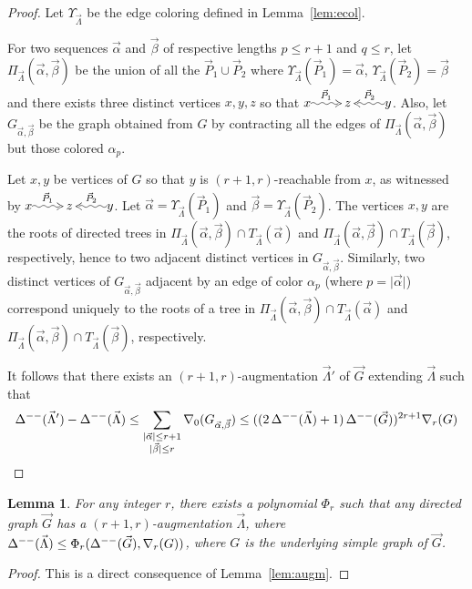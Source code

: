 \documentclass[a4paper]{amsart}
\makeatletter
\newtheorem{lemma}[theorem]{Lemma}
\theoremstyle{definition}
\theoremstyle{remark}
\newcommand\ecol[1]{\Upsilon_{#1}}
\newcommand{\rdens}[1]{\nabla_{#1}}
\newcommand{\card}[1]{\lvert{#1}\rvert}
\DeclareMathOperator\md{\Delta^{\rm --}}
\def\vG{\vec{G}}
\def\vP{\vec{P}}
\def\vL{\vec{\Lambda}}
\newcommand{\rdpath}[1]{\xy\xymatrix{*!{}\ar@{~2>}[r]^{#1}&*!{}}\endxy}
\newcommand{\ldpath}[1]{\xy\xymatrix{*!{}&*!{}\ar@{~2>}[l]_{#1}}\endxy}
\newcommand{\lambd}[5]{{#1}\rdpath{#2}{#3}\ldpath{#4}{#5}}
\makeatother
\begin{document}
\begin{proof}
Let $\ecol{\vL}$ be the edge coloring defined in
  Lemma~\ref{lem:ecol}. 

  For two sequences $\vec{\alpha}$ and $\vec{\beta}$
  of respective lengths $p\leq r+1$ and $q\leq r$,
  let $\Pi_{\vL}(\vec{\alpha},\vec{\beta})$ be the union of all the
  $\vP_1\cup\vP_2$ where $\ecol{\vL}(\vP_1)=\vec{\alpha}$,
  $\ecol{\vL}(\vP_2)=\vec{\beta}$ and there exists three distinct
  vertices $x,y,z$ so that $\lambd{x}{\vP_1}{z}{\vP_2}{y}$. Also,
  let $G_{\vec{\alpha},\vec{\beta}}$ be the graph obtained from $G$ by
  contracting all the edges of $\Pi_{\vL}(\vec{\alpha},\vec{\beta})$
  but those colored $\alpha_p$.

  Let $x,y$ be vertices of $G$ so that $y$ is
  $(r+1,r)$-reachable from $x$, as witnessed by
  $\lambd{x}{\vP_1}{z}{\vP_2}{y}$. Let 
  $\vec{\alpha}=\ecol{\vL}(\vP_1)$ and
  $\vec{\beta}=\ecol{\vL}(\vP_2)$.
  The vertices $x,y$ are the roots of directed trees in 
  $\Pi_{\vL}(\vec{\alpha},\vec{\beta})\cap T_{\vL}(\vec{\alpha})$ and
  $\Pi_{\vL}(\vec{\alpha},\vec{\beta})\cap T_{\vL}(\vec{\beta})$,
  respectively, hence to two adjacent distinct vertices in
  $G_{\vec{\alpha},\vec{\beta}}$.
  Similarly, two distinct vertices of $G_{\vec{\alpha},\vec{\beta}}$
  adjacent by an edge of color $\alpha_p$ (where
  $p=\card{\vec{\alpha}}$) correspond uniquely to the roots of a
  tree in $\Pi_{\vL}(\vec{\alpha},\vec{\beta})\cap T_{\vL}(\vec{\alpha})$ and
  $\Pi_{\vL}(\vec{\alpha},\vec{\beta})\cap T_{\vL}(\vec{\beta})$,
  respectively.

  It follows that there exists an $(r+1,r)$-augmentation $\vL'$ of $\vG$
  extending $\vL$ such that  $$\md(\vL')-\md(\vL)\leq \sum_{\substack{\card{\vec{\alpha}}\leq r+1\\
      \card{\vec{\beta}}\leq r}}
  \rdens{0}(G_{\vec{\alpha},\vec{\beta}})\leq
 ((2\md(\vL)+1)\md(\vG))^{2r+1}\rdens{r}(G)
$$

\end{proof}
\begin{lemma}
\label{lem:augm2}
For any integer $r$, there exists a polynomial $\Phi_r$ such that any
directed graph $\vG$ has a $(r+1,r)$-augmentation $\vL$, where
$\md(\vL)\leq \Phi_r(\md(\vG),\rdens{r}(G))$, where $G$ is the
underlying simple graph of $\vG$.
\end{lemma}
\begin{proof}
This is a direct consequence of Lemma~\ref{lem:augm}.
\end{proof}
\end{document}
